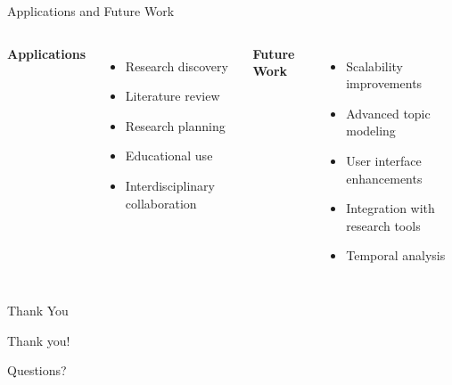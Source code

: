 \documentclass{beamer}
\begin{document}
\begin{frame}{Applications and Future Work}
    \begin{columns}
        \textbf{Applications}
        \begin{itemize}
            \item Research discovery
            \item Literature review
            \item Research planning
            \item Educational use
            \item Interdisciplinary collaboration
        \end{itemize}
        
        \textbf{Future Work}
        \begin{itemize}
            \item Scalability improvements
            \item Advanced topic modeling
            \item User interface enhancements
            \item Integration with research tools
            \item Temporal analysis
        \end{itemize}
    \end{columns}
\end{frame}

\begin{frame}{Thank You}
    \begin{center}
        \Huge Thank you!
        
        \vspace{1cm}
        \large
        Questions?
    \end{center}
\end{frame}
\end{document}
